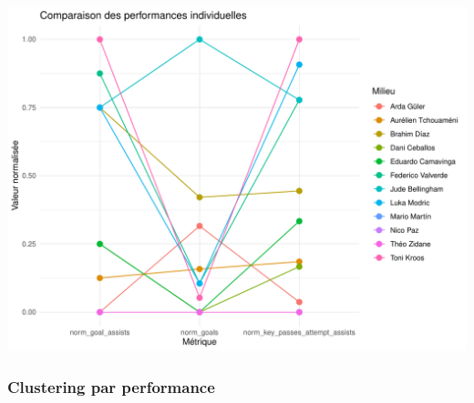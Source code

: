 \documentclass[
  6pt,
]{article}
\begin{document}
\begin{center}\includegraphics[width=0.8\linewidth]{Analyse_Impact_Performances_Joueurs_files/figure-latex/constans-mid-1} \end{center}

\subsubsection{Clustering par
performance}\label{clustering-par-performance}
\end{document}
